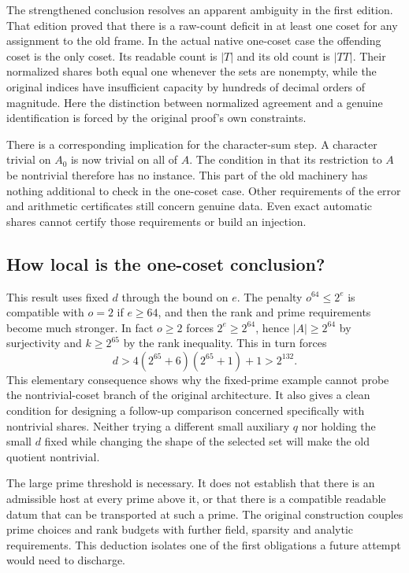 \documentclass[12pt,letterpaper]{article}
\newcommand{\id}[1]{\ifmmode\text{\small\nolinkurl{#1}}\else{\small\nolinkurl{#1}}\fi}
\begin{document}
The strengthened conclusion resolves an apparent ambiguity in the first edition. That edition proved that there is a raw-count deficit in at least one coset for any assignment to the old frame. In the actual native one-coset case the offending coset is the only coset. Its readable count is $|T|$ and its old count is $|TT|$. Their normalized shares both equal one whenever the sets are nonempty, while the original indices have insufficient capacity by hundreds of decimal orders of magnitude. Here the distinction between normalized agreement and a genuine identification is forced by the original proof's own constraints.

There is a corresponding implication for the character-sum step. A character trivial on $A_0$ is now trivial on all of $A$. The condition in \id{tops_sum} that its restriction to $A$ be nontrivial therefore has no instance. This part of the old machinery has nothing additional to check in the one-coset case. Other requirements of the error and arithmetic certificates still concern genuine data. Even exact automatic shares cannot certify those requirements or build an injection.

\subsection{How local is the one-coset conclusion?}
This result uses fixed $d$ through the bound on $e$. The penalty $o^{64}\le2^e$ is compatible with $o=2$ if $e\ge64$, and then the rank and prime requirements become much stronger. In fact $o\ge2$ forces $2^e\ge2^{64}$, hence $|A|\ge2^{64}$ by surjectivity and $k\ge2^{65}$ by the rank inequality. This in turn forces
\[
                 d>4(2^{65}+6)(2^{65}+1)+1>2^{132}.
\]
This elementary consequence shows why the fixed-prime example cannot probe the nontrivial-coset branch of the original architecture. It also gives a clean condition for designing a follow-up comparison concerned specifically with nontrivial shares. Neither trying a different small auxiliary $q$ nor holding the small $d$ fixed while changing the shape of the selected set will make the old quotient nontrivial.

The large prime threshold is necessary. It does not establish that there is an admissible host at every prime above it, or that there is a compatible readable datum that can be transported at such a prime. The original construction couples prime choices and rank budgets with further field, sparsity and analytic requirements. This deduction isolates one of the first obligations a future attempt would need to discharge.
\end{document}
